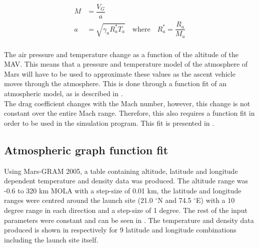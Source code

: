  \begin{equation} \label{eq:machAndSpeedOfSound}
\begin{split}
M &= \dfrac{V_{G}}{a} \\
a &= \sqrt{\gamma_{a}R_{a}^{*}T_{a}} \quad \text{where} \quad R_{a}^{*}=\dfrac{R_{a}}{M_{a}} \\
\end{split}
\end{equation}

The air pressure and temperature change as a function of the altitude of the \ac{MAV}. This means that a pressure and temperature model of the atmosphere of Mars will have to be used to approximate these values as the ascent vehicle moves through the atmosphere. This is done through a function fit of an atmospheric model, as is described in .\\

The drag coefficient changes with the Mach number, however, this change is not constant over the entire Mach range. Therefore, this also requires a function fit in order to be used in the simulation program. This fit is presented in .

\subsection{Atmospheric graph function fit}
\label{subsec:atmofuncfit}
Using Mars-\ac{GRAM} 2005, a table containing altitude, latitude and longitude dependent temperature and density data was produced. The altitude range was -0.6 to 320 km \ac{MOLA} with a step-size of 0.01 km, the latitude and longitude ranges were centred around the launch site (21.0 $^\circ$N and 74.5 $^\circ$E) with a 10 degree range in each direction and a step-size of 1 degree. The rest of the input parameters were constant and can be seen in . The temperature and density data produced is shown in  respectively for 9 latitude and longitude combinations including the launch site itself.                                                                                                                                                                                                                                                                                                                                                                                                                                                                                          


